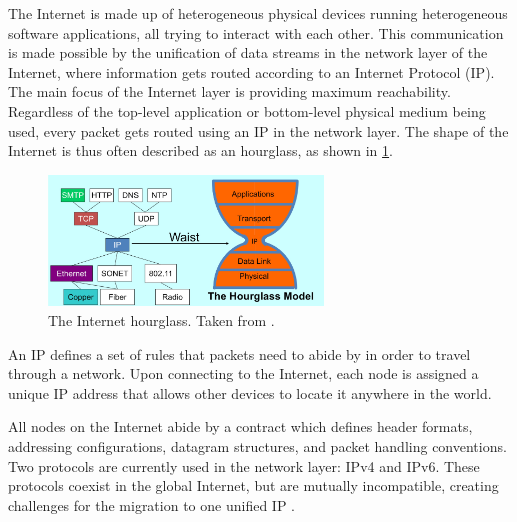 



\label{sec:1}

The Internet is made up of heterogeneous physical devices running heterogeneous software applications, all trying to interact with each other. This communication is made possible by the unification of data streams in the network layer of the Internet, where information gets routed according to an Internet Protocol (IP). The main focus of the Internet layer is providing maximum reachability. Regardless of the top-level application or bottom-level physical medium being used, every packet gets routed using an IP in the network layer. The shape of the Internet is thus often described as an hourglass, as shown in \cref{fig:intro-hourglass}. 

\begin{figure}[htbp]
  \centering
    \includegraphics[width=0.65\textwidth]{figures/introduction/hourglass.jpg}
     \caption{The Internet hourglass. Taken from \cite{lectures}.}
     \label{fig:intro-hourglass}
\end{figure}

An IP defines a set of rules that packets need to abide by in order to travel through a network. Upon connecting to the Internet, each node is assigned a unique IP address that allows other devices to locate it anywhere in the world. 

All nodes on the Internet abide by a contract which defines header formats, addressing configurations, datagram structures, and packet handling conventions. Two protocols are currently used in the network layer: IPv4 and IPv6. These protocols coexist in the global Internet, but are mutually incompatible, creating challenges for the migration to one unified IP \cite{lectures}.

